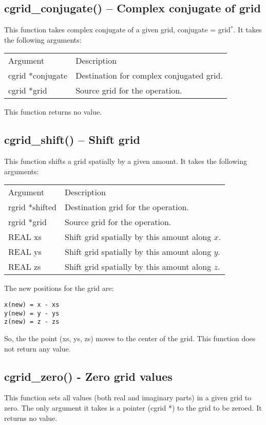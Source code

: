 \documentclass[12pt,letterpaper]{report}
\begin{document}
\subsection{cgrid\_conjugate() -- Complex conjugate of grid}

This function takes complex conjugate of a given grid, conjugate = grid$^*$. It takes the following arguments:
\begin{longtable}{p{} p{}}
Argument & Description\\
\cline{1-2}
cgrid *conjugate & Destination for complex conjugated grid.\\
cgrid *grid & Source grid for the operation.\\
\end{longtable}
\noindent
This function returns no value.

\subsection{cgrid\_shift() -- Shift grid}

This function shifts a grid spatially by a given amount. It takes the following arguments:
\begin{longtable}{p{} p{}}
Argument & Description\\
\cline{1-2}
rgrid *shifted & Destination grid for the operation.\\
rgrid *grid & Source grid for the operation.\\
REAL xs & Shift grid spatially by this amount along $x$.\\
REAL ys & Shift grid spatially by this amount along $y$.\\
REAL zs & Shift grid spatially by this amount along $z$.\\
\end{longtable}
\noindent
The new positions for the grid are:
\begin{verbatim}
x(new) = x - xs 
y(new) = y - ys 
z(new) = z - zs
\end{verbatim}
\noindent
So, the the point (xs, ys, zs) moves to the center of the grid. This function does not return any value.

\subsection{cgrid\_zero() - Zero grid values}

This function sets all values (both real and imaginary parts) in a given grid to zero. The only argument it takes is a pointer (cgrid *) to the grid to be zeroed. It returns no value.
\end{document}
